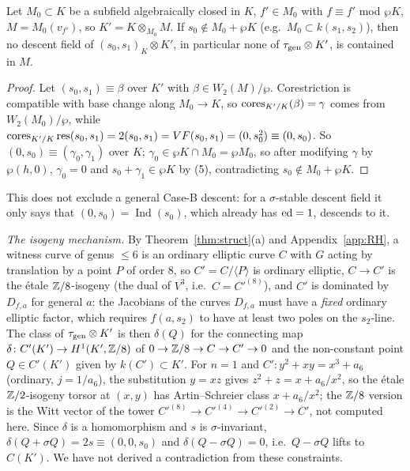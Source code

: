 \begin{proposition}\label{prop:cores}
Let $M_0\subset K$ be a subfield algebraically closed in $K$, $f'\in M_0$ with
$f\equiv f'$ mod $\wp K$, $M=M_0(v_{f'})$, so $K'=K\otimes_{M_0}M$. If $s_0\notin
M_0+\wp K$ (e.g.\ $M_0\subset k(s_1,s_2)$), then no descent field of
$(s_0,s_1)_K\otimes K'$, in particular none of $\tau_{\mathrm{gen}}\otimes K'$, is contained in
$M$. 
\end{proposition}

\begin{proof}
Let $(s_0,s_1)\equiv\beta$ over $K'$ with $\beta\in W_2(M)/\wp$. Corestriction is
compatible with base change along $M_0\to K$, so $\operatorname{cores}_{K'/K}(\beta)=\gamma$ comes from
$W_2(M_0)/\wp$, while $\operatorname{cores}_{K'/K}\operatorname{res}(s_0,s_1)=2(s_0,s_1)=VF(s_0,s_1)=(0,s_0^2)\equiv
(0,s_0)$. So $(0,s_0)\equiv(\gamma_0,\gamma_1)$ over $K$; $\gamma_0\in\wp K\cap M_0=
\wp M_0$, so after modifying $\gamma$ by $\wp(h,0)$, $\gamma_0=0$ and
$s_0+\gamma_1\in\wp K$ by (5), contradicting $s_0\notin M_0+\wp K$.
\end{proof}

This does not exclude a general Case-B descent: for a $\sigma$-stable descent field it
only says that $(0,s_0)=\operatorname{Ind}(s_0)$, which already has $\operatorname{ed}=1$, descends to
it.

\emph{The isogeny mechanism.} By Theorem~\ref{thm:struct}(a) and Appendix~\ref{app:RH},
a witness curve of genus $\le6$ is an ordinary elliptic curve $C$ with $G$ acting by
translation by a point $P$ of order $8$, so $C'=C/\langle P\rangle$ is ordinary elliptic,
$C\to C'$ is the \'etale $\mathbb Z/8$-isogeny (the dual of $V^3$, i.e.\ $C=C'^{(8)}$), and $C'$
is dominated by $D_{f,a}$ for general $a$: the Jacobians of the curves $D_{f,a}$ must have
a \emph{fixed} ordinary elliptic factor, which requires $f(a,s_2)$ to have at least two
poles on the $s_2$-line. The class of $\tau_{\mathrm{gen}}\otimes K'$ is then $\delta(Q)$ for the
connecting map $\delta\colon C'(K')\to H^1(K',\mathbb Z/8)$ of $0\to\mathbb Z/8\to C\to C'\to0$ and
the non-constant point $Q\in C'(K')$ given by $k(C')\subset K'$. For $n=1$ and
$C'\colon y^2+xy=x^3+a_6$ (ordinary, $j=1/a_6$), the substitution $y=xz$ gives
$z^2+z=x+a_6/x^2$, so the \'etale $\mathbb Z/2$-isogeny torsor at $(x,y)$ has Artin--Schreier
class $x+a_6/x^2$; the $\mathbb Z/8$ version is the Witt vector of the tower
$C'^{(8)}\to C'^{(4)}\to C'^{(2)}\to C'$, not computed here. Since $\delta$ is a
homomorphism and $s$ is $\sigma$-invariant, $\delta(Q+\sigma Q)=2s\equiv(0,0,s_0)$ and
$\delta(Q-\sigma Q)=0$, i.e.\ $Q-\sigma Q$ lifts to $C(K')$. We have not derived a
contradiction from these constraints. 

